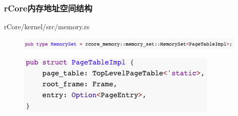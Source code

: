 \begin{frame}[fragile]
    \frametitle{rCore内存地址空间结构}
 	\begin{block}{rCore/kernel/src/memory.rs}
    \begin{figure}
    \includegraphics[width=0.8\linewidth]{figs/type-MemorySet.png}
    \end{figure}
 	\end{block}


    \begin{figure}
    \includegraphics[width=0.5\linewidth]{figs/PageTableImpl.png}
    \end{figure}

\end{frame}
